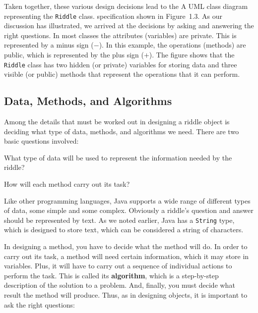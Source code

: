 


\pagebreak
Taken together, these various design decisions lead to the
%
{A UML class diagram representing the  {\tt Riddle} class.
\label{fig-riddleuml}
\label{pg-fig-riddleuml}}
specification shown in Figure~1.3. As our discussion has illustrated,
we arrived at the decisions by asking and answering the right
questions. In most classes the attributes (variables) are
private. This is represented by a minus sign ($-$). In this example,
the operations (methods) are public, which is represented by the plus
sign ($+$). The figure shows that the {\tt Riddle} class has two
hidden (or private) variables for storing data and three visible (or
public) methods that represent the operations that it can perform.

\subsection{Data, Methods, and Algorithms}

\noindent Among the details that must be worked out in
designing a riddle object is deciding what type of data, methods, and
algorithms we need.  There are two basic questions involved:

\begin{BL}
\item  What type of data will be used to represent the information
needed by the riddle?
\item  How will each method carry out its task?
\end{BL}

\noindent Like other programming languages, Java supports a
wide range of different types of data, some simple and some complex.
Obviously a riddle's question and answer should be represented by
text.  As we noted earlier, Java has a {\tt String} type, which is
designed to store text, which can be considered a string of
characters.

In designing a method, you have to decide what the method will do.  
In order to carry out its task, a method will need certain information,
which it may store in variables.  Plus, it will have to carry out a
sequence of individual actions to perform the task. This is called its
{\bf algorithm}, which is a step-by-step description of the solution
to a problem.  And, finally, you must decide what result the method
will produce.  Thus, as in designing objects, it is important to ask
the right questions:


